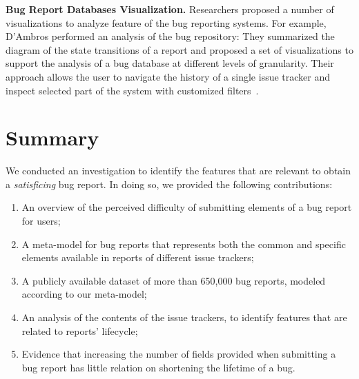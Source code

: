 \textbf{Bug Report Databases Visualization.} Researchers proposed a number of visualizations to analyze feature of the bug reporting systems.
For example, D'Ambros \etal performed an analysis of the \bzilla bug repository: They summarized the diagram of the state transitions of a report and proposed a set of visualizations to support the analysis of a bug database at different levels of granularity.
Their approach allows the user to navigate the history of a single issue tracker and inspect selected part of the system with customized filters~\cite{DAmb2007b}.



\section{Summary} \label{sec:model-summary}

We conducted an investigation to identify the features that are relevant to obtain a \emph{satisficing} bug report.
In doing so, we provided the following contributions:

\begin{enumerate}

\item An overview of the perceived difficulty of submitting elements of a bug report for users;

\item A meta-model for bug reports that represents both the common and specific elements available in reports of different issue trackers;

\item A publicly available dataset of more than 650,000 bug reports, modeled according to our meta-model;

\item An analysis of the contents of the issue trackers, to identify features that are related to reports' lifecycle;

\item Evidence that increasing the number of fields provided when submitting a bug report has little relation on shortening the lifetime of a bug.

\end{enumerate}

